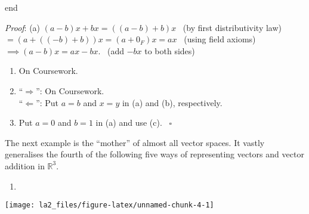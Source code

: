 \documentclass[
  12pt,
  a4paper,
  twoside]{article}
\providecommand{\tightlist}{%
  \setlength{\itemsep}{0pt}\setlength{\parskip}{0pt}}
\theoremstyle{plain}
\theoremstyle{definition}
\begin{document}
\csname end

\emph{Proof}:
(a) \((a-b)x + bx = ((a-b)+b)x\) \hfill~{(by first distributivity law)}\\
\hspace*{0.333em}\hspace*{0.333em}\hspace*{0.333em}\hspace*{0.333em}\hspace*{0.333em}\hspace*{0.333em}\hspace*{0.333em}\hspace*{0.333em}\hspace*{0.333em}\hspace*{0.333em}\(= \left(a+((-b)+b)\right)x=(a+0_F)x = ax\) \hfill~{(using field axioms)}\\
\hspace*{0.333em}\hspace*{0.333em}\hspace*{0.333em}\hspace*{0.333em}\hspace*{0.333em}\hspace*{0.333em}\(\implies (a-b)x = ax - bx\). \hfill~{(add \(-bx\) to both sides)}

\begin{enumerate}
\def\labelenumi{(\alph{enumi})}
\setcounter{enumi}{1}
\item
  On Coursework.
\item
  ``\(\Longrightarrow\)'': On Coursework.\\
  ``\(\Longleftarrow\)'': Put \(a=b\) and \(x=y\) in (a) and (b), respectively.
\item
  Put \(a=0\) and \(b=1\) in (a) and use (c). \hfill~{\(\square\)}
\end{enumerate}

The next example is the ``mother'' of almost all vector spaces.
It vastly generalises the fourth of the following five ways of representing vectors and vector addition in \(\mathbb{R}^{3}\).

\newpage

\begin{enumerate}
\def\labelenumi{(\Roman{enumi})}
\tightlist
\item
\end{enumerate}

\begin{center}\texttt{[image: la2\_files/figure-latex/unnamed-chunk-4-1]} \end{center}
\end{document}
